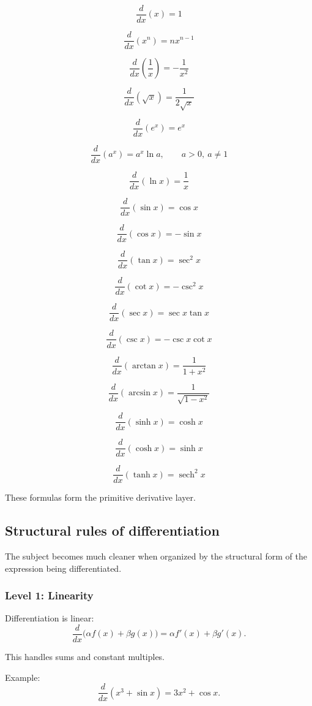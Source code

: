 \documentclass{article}
\begin{document}
	\[
	\frac{d}{dx}(x)=1
	\]
	
	\[
	\frac{d}{dx}(x^n)=nx^{n-1}
	\]
	
	\[
	\frac{d}{dx}\left(\frac{1}{x}\right)=-\frac{1}{x^2}
	\]
	
	\[
	\frac{d}{dx}(\sqrt{x})=\frac{1}{2\sqrt{x}}
	\]
	
	\[
	\frac{d}{dx}(e^x)=e^x
	\]
	
	\[
	\frac{d}{dx}(a^x)=a^x\ln a,
	\qquad a>0,\ a\neq 1
	\]
	
	\[
	\frac{d}{dx}(\ln x)=\frac{1}{x}
	\]
	
	\[
	\frac{d}{dx}(\sin x)=\cos x
	\]
	
	\[
	\frac{d}{dx}(\cos x)=-\sin x
	\]
	
	\[
	\frac{d}{dx}(\tan x)=\sec^2 x
	\]
	
	\[
	\frac{d}{dx}(\cot x)=-\csc^2 x
	\]
	
	\[
	\frac{d}{dx}(\sec x)=\sec x\tan x
	\]
	
	\[
	\frac{d}{dx}(\csc x)=-\csc x\cot x
	\]
	
	\[
	\frac{d}{dx}(\arctan x)=\frac{1}{1+x^2}
	\]
	
	\[
	\frac{d}{dx}(\arcsin x)=\frac{1}{\sqrt{1-x^2}}
	\]
	
	\[
	\frac{d}{dx}(\sinh x)=\cosh x
	\]
	
	\[
	\frac{d}{dx}(\cosh x)=\sinh x
	\]
	
	\[
	\frac{d}{dx}(\tanh x)=\operatorname{sech}^2 x
	\]
	
	These formulas form the primitive derivative layer.
	
	\subsection{Structural rules of differentiation}
	
	The subject becomes much cleaner when organized by the structural form of the expression being differentiated.
	
	\subsubsection{Level 1: Linearity}
	
	Differentiation is linear:
	\[
	\frac{d}{dx}\bigl(\alpha f(x)+\beta g(x)\bigr)
	=
	\alpha f'(x)+\beta g'(x).
	\]
	
	This handles sums and constant multiples.
	
	Example:
	\[
	\frac{d}{dx}(x^3+\sin x)=3x^2+\cos x.
	\]
	
\end{document}
